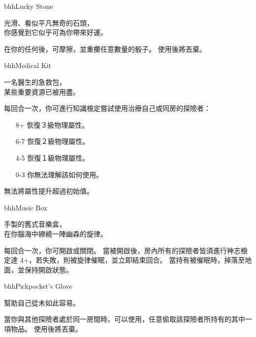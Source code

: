 \linebreak[0]%
\begin{ItemCard}{bhh}{Lucky Stone}{}
  \begin{CardStory}
    光滑、看似平凡無奇的石頭，\\
    你感覺到它似乎可為你帶來好運。
  \end{CardStory}
  在你的任何\RollAny{}後，可摩擦\ThisName{}，並重擲任意數量的骰子。\smallbreak
  使用後將\ThisName{}丟棄。\smallbreak
\end{ItemCard}%
\linebreak[0]%
\begin{ItemCard}{bhh}{Medical Kit}{}
  \begin{CardStory}
    一名醫生的急救包，\\
    某些重要資源已被用盡。
  \end{CardStory}
  每回合一次，你可進行知識檢定嘗試使用\ThisName{}治療自己或同房的探險者：
  \begin{itemize}
    \item[8+] 恢復３級物理屬性。
    \item[6-7] 恢復２級物理屬性。
    \item[4-5] 恢復１級物理屬性。
    \item[0-3] 你無法理解\ThisName{}該如何使用。
  \end{itemize}
  \ThisName{}無法將屬性提升超過初始值。\smallbreak
\end{ItemCard}%
\linebreak[0]%
\begin{ItemCard}{bhh}{Music Box}{}
  \begin{CardStory}
    手製的舊式音樂盒，\\
    在你腦海中繚繞一陣幽森的旋律。
  \end{CardStory}
  每回合一次，你可開啟或關閉\ThisName{}。\smallbreak
  當\ThisName{}被開啟後，房內所有的探險者皆須進行神志檢定達 4+，若失敗，則被旋律催眠，並立即結束回合。\smallbreak
  當持有\ThisName{}被催眠時，\ThisName{}掉落至地面，並保持開啟狀態。\smallbreak
\end{ItemCard}%
\linebreak[0]%
\begin{ItemCard}{bhh}{Pickpocket’s Glove}{}
  \begin{CardStory}
    幫助自己從未如此容易。
  \end{CardStory}
  當你與其他探險者處於同一房間時，可以使用\ThisName{}，任意偷取該探險者所持有的其中一項物品。\smallbreak
  使用後將\ThisName{}丟棄。\smallbreak
\end{ItemCard}%
